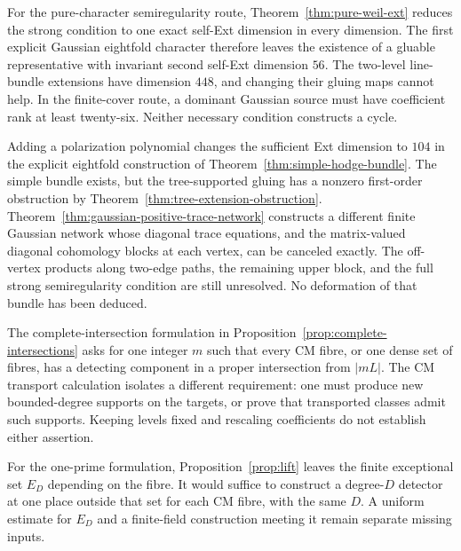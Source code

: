 For the pure-character semiregularity route, Theorem~\ref{thm:pure-weil-ext} reduces the strong condition to one exact self-Ext dimension in every dimension. The first explicit Gaussian eightfold character therefore leaves the existence of a gluable representative with invariant second self-Ext dimension $56$. The two-level line-bundle extensions have dimension $448$, and changing their gluing maps cannot help. In the finite-cover route, a dominant Gaussian source must have coefficient rank at least twenty-six. Neither necessary condition constructs a cycle.

Adding a polarization polynomial changes the sufficient Ext dimension
to $104$ in the explicit eightfold construction of
Theorem~\ref{thm:simple-hodge-bundle}.
The simple bundle exists, but the tree-supported gluing has a
nonzero first-order obstruction by
Theorem~\ref{thm:tree-extension-obstruction}.
Theorem~\ref{thm:gaussian-positive-trace-network} constructs a different
finite Gaussian network whose diagonal trace equations, and the
matrix-valued diagonal cohomology blocks at each vertex, can be
canceled exactly.  The off-vertex products along two-edge paths,
the remaining upper block, and the full strong semiregularity
condition are still unresolved.  No deformation of that bundle
has been deduced.

The complete-intersection formulation in Proposition~\ref{prop:complete-intersections} asks for one integer $m$ such that every CM fibre, or one dense set of fibres, has a detecting component in a proper intersection from $|mL|$. The CM transport calculation isolates a different requirement: one must produce new bounded-degree supports on the targets, or prove that transported classes admit such supports. Keeping levels fixed and rescaling coefficients do not establish either assertion.

For the one-prime formulation, Proposition~\ref{prop:lift} leaves the finite exceptional set $E_D$ depending on the fibre. It would suffice to construct a degree-$D$ detector at one place outside that set for each CM fibre, with the same $D$. A uniform estimate for $E_D$ and a finite-field construction meeting it remain separate missing inputs.


